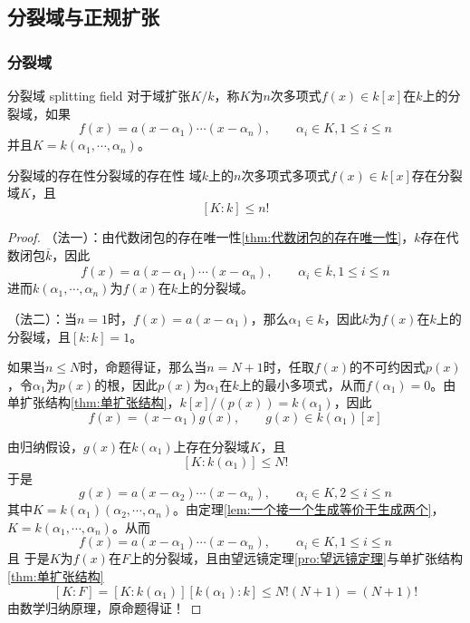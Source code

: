 \subsection{分裂域与正规扩张}

\subsubsection{分裂域}

\begin{definition}{分裂域 splitting field}
	对于域扩张$K/k$，称$K$为$n$次多项式$f(x)\in k[x]$在$k$上的分裂域，如果
	$$
	f(x)=a(x-\alpha_1)\cdots(x-\alpha_n),\qquad \alpha_i\in K,1\le i \le n
	$$
	并且$K=k(\alpha_1,\cdots,\alpha_n)$。
\end{definition}

\begin{lemma}{分裂域的存在性}{分裂域的存在性}
	域$k$上的$n$次多项式多项式$f(x)\in k[x]$存在分裂域$K$，且%
	$$
	[K:k]\le n!
	$$
\end{lemma}

\begin{proof}
	（法一）：由代数闭包的存在唯一性\ref{thm:代数闭包的存在唯一性}，$k$存在代数闭包$\overline{k}$，因此
	$$
	f(x)=a(x-\alpha_1)\cdots(x-\alpha_n),\qquad \alpha_i\in \overline{k},1\le i \le n
	$$
	进而$k(\alpha_1,\cdots,\alpha_n)$为$f(x)$在$k$上的分裂域。
	
	（法二）：当$n=1$时，$f(x)=a(x-\alpha_1)$，那么$\alpha_1\in k$，因此$k$为$f(x)$在$k$上的分裂域，且$[k:k]=1$。
	
	如果当$n\le N$时，命题得证，那么当$n=N+1$时，任取$f(x)$的不可约因式$p(x)$，令$\alpha_1$为$p(x)$的根，因此$p(x)$为$\alpha_1$在$k$上的最小多项式，从而$f(\alpha_1)=0$。由单扩张结构\ref{thm:单扩张结构}，$k[x]/(p(x))=k(\alpha_1)$，因此
	$$
	f(x)=(x-\alpha_1)g(x),\qquad g(x)\in k(\alpha_1)[x]
	$$
	
	由归纳假设，$g(x)$在$k(\alpha_1)$上存在分裂域$K$，且
	$$
	[K:k(\alpha_1)]\le N!
	$$
	于是%
	$$
	g(x)=a(x-\alpha_2)\cdots(x-\alpha_{n}),\qquad \alpha_i\in K,2\le i \le n
	$$
	其中$K=k(\alpha_1)(\alpha_2,\cdots,\alpha_{n})$。由定理\ref{lem:一个接一个生成等价于生成两个}，$K=k(\alpha_1,\cdots,\alpha_{n})$。从而
	$$
	f(x)=a(x-\alpha_1)\cdots(x-\alpha_n),\qquad \alpha_i\in K,1\le i \le n
	$$
	且
	于是$K$为$f(x)$在$F$上的分裂域，且由望远镜定理\ref{pro:望远镜定理}与单扩张结构\ref{thm:单扩张结构}
	$$
	[K:F]=[K:k(\alpha_1)][k(\alpha_1):k]\le N!(N+1)=(N+1)!
	$$
	由数学归纳原理，原命题得证！
\end{proof}

